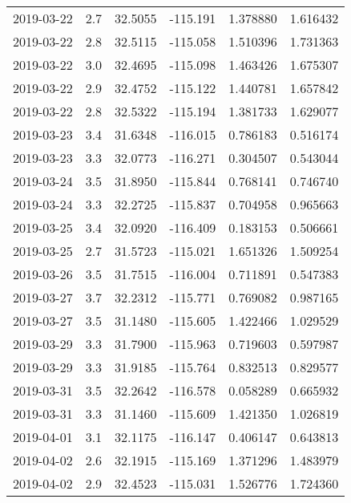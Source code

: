 \begin{tabular}{lrrrrr}
2019-03-22 &       2.7 &  32.5055 &  -115.191 &         1.378880 &         1.616432 \\
2019-03-22 &       2.8 &  32.5115 &  -115.058 &         1.510396 &         1.731363 \\
2019-03-22 &       3.0 &  32.4695 &  -115.098 &         1.463426 &         1.675307 \\
2019-03-22 &       2.9 &  32.4752 &  -115.122 &         1.440781 &         1.657842 \\
2019-03-22 &       2.8 &  32.5322 &  -115.194 &         1.381733 &         1.629077 \\
2019-03-23 &       3.4 &  31.6348 &  -116.015 &         0.786183 &         0.516174 \\
2019-03-23 &       3.3 &  32.0773 &  -116.271 &         0.304507 &         0.543044 \\
2019-03-24 &       3.5 &  31.8950 &  -115.844 &         0.768141 &         0.746740 \\
2019-03-24 &       3.3 &  32.2725 &  -115.837 &         0.704958 &         0.965663 \\
2019-03-25 &       3.4 &  32.0920 &  -116.409 &         0.183153 &         0.506661 \\
2019-03-25 &       2.7 &  31.5723 &  -115.021 &         1.651326 &         1.509254 \\
2019-03-26 &       3.5 &  31.7515 &  -116.004 &         0.711891 &         0.547383 \\
2019-03-27 &       3.7 &  32.2312 &  -115.771 &         0.769082 &         0.987165 \\
2019-03-27 &       3.5 &  31.1480 &  -115.605 &         1.422466 &         1.029529 \\
2019-03-29 &       3.3 &  31.7900 &  -115.963 &         0.719603 &         0.597987 \\
2019-03-29 &       3.3 &  31.9185 &  -115.764 &         0.832513 &         0.829577 \\
2019-03-31 &       3.5 &  32.2642 &  -116.578 &         0.058289 &         0.665932 \\
2019-03-31 &       3.3 &  31.1460 &  -115.609 &         1.421350 &         1.026819 \\
2019-04-01 &       3.1 &  32.1175 &  -116.147 &         0.406147 &         0.643813 \\
2019-04-02 &       2.6 &  32.1915 &  -115.169 &         1.371296 &         1.483979 \\
2019-04-02 &       2.9 &  32.4523 &  -115.031 &         1.526776 &         1.724360 \\

\end{tabular}
